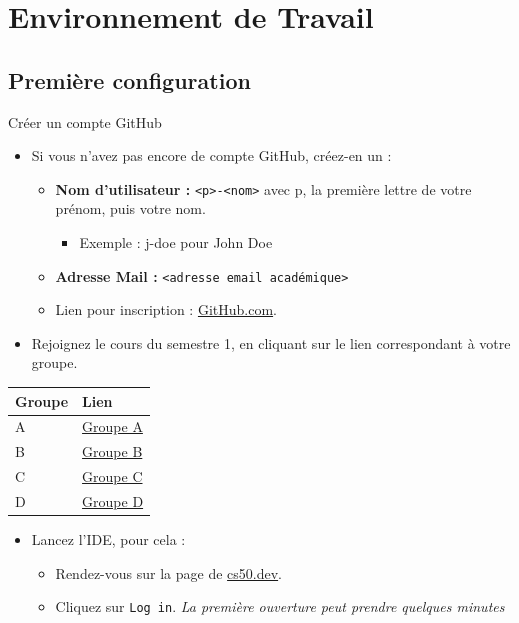 
\section{Environnement de Travail}

\subsection{Première configuration}

\begin{UPSTIManipulation}{Créer un compte GitHub}
	\begin{itemize}
		\item[$\Box$] Si vous n'avez pas encore de compte GitHub, créez-en un :
		      \begin{itemize}
			      \item \textbf{Nom d'utilisateur :} \texttt{<p>-<nom>} avec p, la première lettre de votre prénom, puis votre nom.
			            \begin{itemize}
				            \item Exemple : j-doe pour John Doe
			            \end{itemize}
			      \item \textbf{Adresse Mail :} \texttt{<adresse email académique>}
			      \item[$\Box$] Lien pour inscription : \href{https://github.com}{GitHub.com}.
		      \end{itemize}
		\item[$\Box$] Rejoignez le cours du semestre 1, en cliquant sur le lien correspondant à votre groupe.
	\end{itemize}
	\begin{center}
		\begin{tabular}{|l|l|}
			\hline
			Groupe & Lien                                                                             \\
			\hline
			A      & \href{https://submit.cs50.io/invites/9a6f6de5408b4022baebeb336f409261}{Groupe A} \\
			B      & \href{https://submit.cs50.io/invites/f70e5bcd71c941a7acd2cbd7739218d8}{Groupe B} \\
			C      & \href{https://submit.cs50.io/invites/88bf318c8b054f7a959ea7371f2b8011}{Groupe C} \\
			D      & \href{https://submit.cs50.io/invites/e58130b1d7874ca481da62a0795da120}{Groupe D} \\
			\hline
		\end{tabular}
	\end{center}
	\begin{itemize}
		\item[$\Box$] Lancez l'IDE, pour cela :
		      \begin{itemize}
			      \item[$\Box$] Rendez-vous sur la page de \href{https://cs50.dev}{cs50.dev}.
			      \item[$\Box$] Cliquez sur \texttt{Log in}. \textit{La première ouverture peut prendre quelques minutes}
		      \end{itemize}
	\end{itemize}
\end{UPSTIManipulation}

